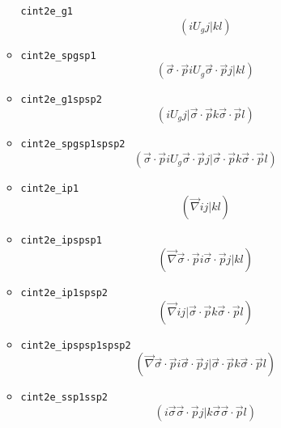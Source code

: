 \documentclass[]{article}
\begin{document}
\begin{itemize}
\begin{itemize}
    \texttt{cint2e\_g1} \[(i U_g j| kl)\]
  \item
    \texttt{cint2e\_spgsp1}
    \[(\vec{\sigma}\cdot\vec{p} i U_g \vec{\sigma}\cdot\vec{p} j| kl)\]
  \item
    \texttt{cint2e\_g1spsp2}
    \[(i U_g j| \vec{\sigma}\cdot\vec{p} k \vec{\sigma}\cdot\vec{p}l)\]
  \item
    \texttt{cint2e\_spgsp1spsp2}
    \[(\vec{\sigma}\cdot\vec{p} i U_g \vec{\sigma}\cdot\vec{p} j| \vec{\sigma}\cdot\vec{p} k \vec{\sigma}\cdot\vec{p}l)\]
  \item
    \texttt{cint2e\_ip1} \[(\vec{\nabla} i j| kl)\]
  \item
    \texttt{cint2e\_ipspsp1}
    \[(\vec{\nabla} \vec{\sigma}\cdot\vec{p} i \vec{\sigma}\cdot\vec{p} j| kl)\]
  \item
    \texttt{cint2e\_ip1spsp2}
    \[(\vec{\nabla} i j| \vec{\sigma}\cdot\vec{p} k \vec{\sigma}\cdot\vec{p}l)\]
  \item
    \texttt{cint2e\_ipspsp1spsp2}
    \[(\vec{\nabla} \vec{\sigma}\cdot\vec{p} i \vec{\sigma}\cdot\vec{p} j| \vec{\sigma}\cdot\vec{p} k \vec{\sigma}\cdot\vec{p}l)\]
  \item
    \texttt{cint2e\_ssp1ssp2}
    \[( i \vec{\sigma}\vec{\sigma}\cdot\vec{p} j|k \vec{\sigma}\vec{\sigma}\cdot\vec{p}l)\]
  \end{itemize}
\end{itemize}
\end{document}
